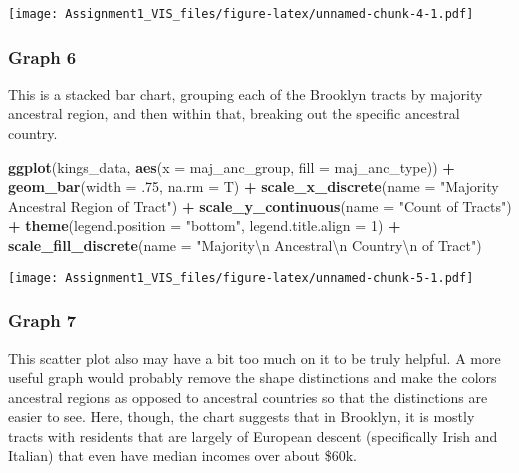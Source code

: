 \documentclass[
]{article}
\newenvironment{Shaded}{\begin{snugshade}}{\end{snugshade}}
\newcommand{\CharTok}[1]{\textcolor[rgb]{0.31,0.60,0.02}{#1}}
\newcommand{\DataTypeTok}[1]{\textcolor[rgb]{0.13,0.29,0.53}{#1}}
\newcommand{\DecValTok}[1]{\textcolor[rgb]{0.00,0.00,0.81}{#1}}
\newcommand{\FloatTok}[1]{\textcolor[rgb]{0.00,0.00,0.81}{#1}}
\newcommand{\KeywordTok}[1]{\textcolor[rgb]{0.13,0.29,0.53}{\textbf{#1}}}
\newcommand{\NormalTok}[1]{#1}
\newcommand{\OperatorTok}[1]{\textcolor[rgb]{0.81,0.36,0.00}{\textbf{#1}}}
\newcommand{\StringTok}[1]{\textcolor[rgb]{0.31,0.60,0.02}{#1}}
\begin{document}
\texttt{[image: Assignment1\_VIS\_files/figure-latex/unnamed-chunk-4-1.pdf]}

\hypertarget{graph-6}{%
\subsubsection{Graph 6}\label{graph-6}}

This is a stacked bar chart, grouping each of the Brooklyn tracts by
majority ancestral region, and then within that, breaking out the
specific ancestral country.

\begin{Shaded}
\begin{Highlighting}[]
\KeywordTok{ggplot}\NormalTok{(kings_data,}
       \KeywordTok{aes}\NormalTok{(}\DataTypeTok{x =}\NormalTok{ maj_anc_group, }\DataTypeTok{fill =}\NormalTok{ maj_anc_type)) }\OperatorTok{+}
\StringTok{  }\KeywordTok{geom_bar}\NormalTok{(}\DataTypeTok{width =} \FloatTok{.75}\NormalTok{, }\DataTypeTok{na.rm =}\NormalTok{ T) }\OperatorTok{+}
\StringTok{  }\KeywordTok{scale_x_discrete}\NormalTok{(}\DataTypeTok{name =} \StringTok{"Majority Ancestral Region of Tract"}\NormalTok{) }\OperatorTok{+}
\StringTok{  }\KeywordTok{scale_y_continuous}\NormalTok{(}\DataTypeTok{name =} \StringTok{"Count of Tracts"}\NormalTok{) }\OperatorTok{+}
\StringTok{  }\KeywordTok{theme}\NormalTok{(}\DataTypeTok{legend.position =} \StringTok{"bottom"}\NormalTok{, }\DataTypeTok{legend.title.align =} \DecValTok{1}\NormalTok{) }\OperatorTok{+}
\StringTok{  }\KeywordTok{scale_fill_discrete}\NormalTok{(}\DataTypeTok{name =} \StringTok{"Majority}\CharTok{\textbackslash{}n}\StringTok{ Ancestral}\CharTok{\textbackslash{}n}\StringTok{ Country}\CharTok{\textbackslash{}n}\StringTok{ of Tract"}\NormalTok{)}
\end{Highlighting}
\end{Shaded}

\texttt{[image: Assignment1\_VIS\_files/figure-latex/unnamed-chunk-5-1.pdf]}

\hypertarget{graph-7}{%
\subsubsection{Graph 7}\label{graph-7}}

This scatter plot also may have a bit too much on it to be truly
helpful. A more useful graph would probably remove the shape
distinctions and make the colors ancestral regions as opposed to
ancestral countries so that the distinctions are easier to see. Here,
though, the chart suggests that in Brooklyn, it is mostly tracts with
residents that are largely of European descent (specifically Irish and
Italian) that even have median incomes over about \$60k.
\end{document}
